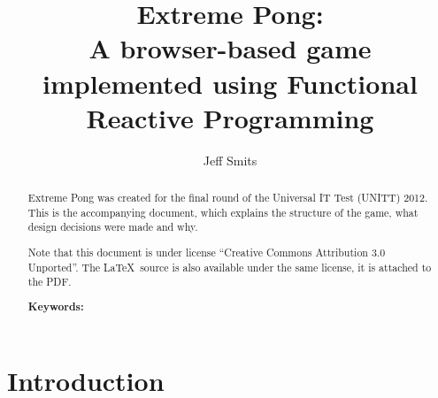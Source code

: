 \documentclass[a4paper]{article}
\begin{document}
\title{Extreme Pong: \\
A browser-based game implemented using Functional Reactive
 Programming}
\author{Jeff Smits}
\date{}

\maketitle

\begin{abstract}
Extreme Pong was created for the final round of the Universal IT Test
 (UNITT) 2012. This is the accompanying document, which explains the
 structure of the game, what design decisions were made and why. 
 
Note that this document is under license ``Creative Commons
 Attribution 3.0 Unported''. The \LaTeX\ source is also available
 under the same license, it is attached to the PDF. 

\smallskip
\noindent\textbf{Keywords:} 
\end{abstract}

\newpage

\section{Introduction}
\end{document}
